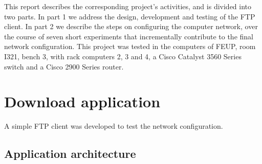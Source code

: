\documentclass[a4paper, 11pt]{report}
\begin{document}
This report describes the corresponding project's activities, and is divided into two parts.
In part 1 we address the design, development and testing of the FTP client.
In part 2 we describe the steps on configuring the computer network, over the course of seven short experiments that incrementally contribute to the final network configuration.
This project was tested in the computers of FEUP, room I321, bench 3, with rack computers 2, 3 and 4, a Cisco Catalyst 3560 Series switch and a Cisco 2900 Series router.

\section{Download application} \label{sec:Part1}

A simple FTP client was developed to test the network configuration.

\subsection{Application architecture} \label{sec:Arc}





\end{document}
